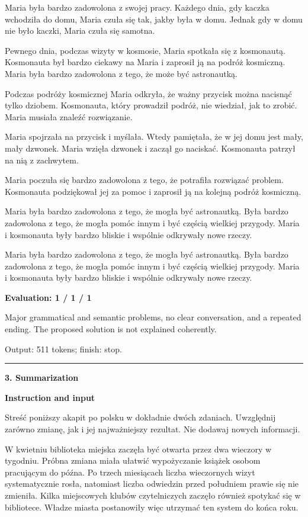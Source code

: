\documentclass[10pt]{article}
\begin{document}
{\begin{minipage}{\textwidth}
Maria była bardzo zadowolona z swojej pracy. Każdego dnia, gdy kaczka wchodziła do domu, Maria czuła się tak, jakby była w domu. Jednak gdy w domu nie było kaczki, Maria czuła się samotna.
\par\smallskip
Pewnego dnia, podczas wizyty w kosmosie, Maria spotkała się z kosmonautą. Kosmonauta był bardzo ciekawy na Maria i zaprosił ją na podróż kosmiczną. Maria była bardzo zadowolona z tego, że może być astronautką.
\par\smallskip
Podczas podróży kosmicznej Maria odkryła, że ważny przycisk można nacisnąć tylko dziobem. Kosmonauta, który prowadził podróż, nie wiedział, jak to zrobić. Maria musiała znaleźć rozwiązanie.
\par\smallskip
Maria spojrzała na przycisk i myślała. Wtedy pamiętała, że w jej domu jest mały, mały dzwonek. Maria wzięła dzwonek i zaczął go naciskać. Kosmonauta patrzył na nią z zachwytem.
\par\smallskip
Maria poczuła się bardzo zadowolona z tego, że potrafiła rozwiązać problem. Kosmonauta podziękował jej za pomoc i zaprosił ją na kolejną podróż kosmiczną.
\par\smallskip
Maria była bardzo zadowolona z tego, że mogła być astronautką. Była bardzo zadowolona z tego, że mogła pomóc innym i być częścią wielkiej przygody. Maria i kosmonauta były bardzo bliskie i wspólnie odkrywały nowe rzeczy.
\par\smallskip
Maria była bardzo zadowolona z tego, że mogła być astronautką. Była bardzo zadowolona z tego, że mogła pomóc innym i być częścią wielkiej przygody. Maria i kosmonauta były bardzo bliskie i wspólnie odkrywały nowe rzeczy.\par\smallskip
\textbf{Evaluation: 1 / 1 / 1}\par Major grammatical and semantic problems, no clear conversation, and a repeated ending. The proposed solution is not explained coherently.
\par {\color{gray} Output: 511 tokens; finish: stop.}\par
\medskip\hrule\smallskip
{\bfseries 3. Summarization}\par\smallskip
\textbf{Instruction and input}\par Streść poniższy akapit po polsku w dokładnie dwóch zdaniach. Uwzględnij zarówno zmianę, jak i jej najważniejszy rezultat. Nie dodawaj nowych informacji.
\par\smallskip
W kwietniu biblioteka miejska zaczęła być otwarta przez dwa wieczory w tygodniu. Próbna zmiana miała ułatwić wypożyczanie książek osobom pracującym do późna. Po trzech miesiącach liczba wieczornych wizyt systematycznie rosła, natomiast liczba odwiedzin przed południem prawie się nie zmieniła. Kilka miejscowych klubów czytelniczych zaczęło również spotykać się w bibliotece. Władze miasta postanowiły więc utrzymać ten system do końca roku.\par\smallskip

\end{minipage}}
\end{document}
